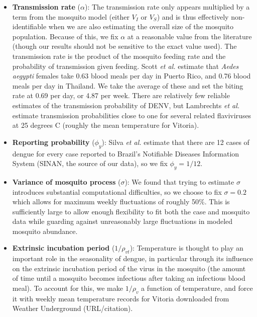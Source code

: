\documentclass[10pt,letterpaper]{article}
\begin{document}
\begin{itemize}
\item \textbf{Transmission rate} ($\alpha$): The transmission rate only appears multiplied by a term from the mosquito model (either $V_I$ or $V_S$) and is thus effectively non-identifiable when we are also estimating the overall size of the mosquito population.
Because of this, we fix $\alpha$ at a reasonable value from the literature (though our results should not be sensitive to the exact value used).
The transmission rate is the product of the mosquito feeding rate and the probability of transmission given feeding.
Scott \textit{et al.} \cite{Scott2000} estimate that \textit{Aedes aegypti} females take 0.63 blood meals per day in Puerto Rico, and 0.76 blood meals per day in Thailand.
We take the average of these and set the biting rate at 0.69 per day, or 4.87 per week.
There are relatively few reliable estimates of the transmission probability of DENV, but Lambrechts \textit{et al.} \cite{Lambrechts2011} estimate transmission probabilities close to one  for several related flaviviruses at 25 degrees C (roughly the mean temperature for Vitoria).
\\
\item \textbf{Reporting probability} ($\phi_y$): Silva \textit{et al.} \cite{Silva2016} estimate that there are 12 cases of dengue for every case reported to Brazil's Notifiable Diseases Information System (SINAN, the source of our data), so we fix $\phi_y = 1/12$.
\\
\item \textbf{Variance of mosquito process} ($\sigma$): We found that trying to estimate $\sigma$ introduces substantial computational difficulties, so we choose to fix $\sigma = 0.2$ which allows for maximum weekly fluctuations of roughly 50\%.
This is sufficiently large to allow enough flexibility to fit both the case and mosquito data while guarding against unreasonably large fluctuations in modeled mosquito abundance.
\\
\item \textbf{Extrinsic incubation period} ($1/\rho_{vt}$): Temperature is thought to play an important role in the seasonality of dengue, in particular through its influence on the extrinsic incubation period of the virus in the mosquito  (the amount of time until a mosquito becomes infectious after taking an infectious blood meal).
To account for this, we make $1/\rho_v$ a function of temperature, and force it with weekly mean temperature records for Vitoria downloaded from Weather Underground (URL/citation).

\end{itemize}
\end{document}
